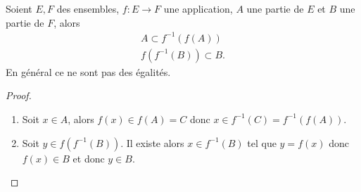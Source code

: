 %
\begin{prop}
  Soient \(E,F\) des ensembles, \(f:E\longrightarrow F\) une application, \(A\) une partie de \(E\) et \(B\) une partie de \(F\), alors
  \begin{gather}
    A \subset f^{-1}(f(A)) \\
    f(f^{-1}(B)) \subset B.
  \end{gather}
  En général ce ne sont pas des égalités.
\end{prop}
\begin{proof}
  \begin{enumerate}
  \item Soit \(x \in A\), alors \(f(x) \in f(A) = C\) donc \(x \in f^{-1}(C)=f^{-1}(f(A))\).
  \item Soit \(y \in f(f^{-1}(B))\). Il existe alors \(x \in f^{-1}(B)\) tel que \(y=f(x)\) donc \(f(x) \in B\) et donc \(y \in B\).
  \end{enumerate}
\end{proof}
%
